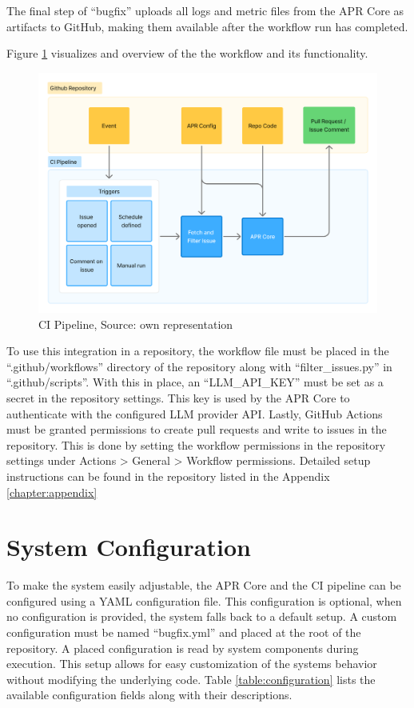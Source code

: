 The final step of ``bugfix'' uploads all logs and metric files from the APR Core as artifacts to GitHub, making them available after the workflow run has completed.

Figure \ref{fig:ci} visualizes and overview of the the workflow and its functionality.

\begin{figure}[H]
    \centering
    \includegraphics[width=1\textwidth]{images/flowcharts/ci.png}
    \caption{CI Pipeline, Source: own representation}
    \label{fig:ci}
\end{figure}

To use this integration in a repository, the workflow file must be placed in the ``.github/workflows'' directory of the repository along with ``filter\_issues.py'' in ``.github/scripts''. With this in place, an ``LLM\_API\_KEY'' must be set as a secret in the repository settings. This key is used by the APR Core to authenticate with the configured \ac{LLM} provider API. Lastly, GitHub Actions must be granted permissions to create pull requests and write to issues in the repository. This is done by setting the workflow permissions in the repository settings under Actions > General > Workflow permissions. Detailed setup instructions can be found in the repository listed in the Appendix \ref{chapter:appendix}

\section{System Configuration}
To make the system easily adjustable, the APR Core and the \ac{CI} pipeline can be configured using a YAML configuration file. This configuration is optional, when no configuration is provided, the system falls back to a default setup. A custom configuration must be named ``bugfix.yml'' and placed at the root of the repository. A placed configuration is read by system components during execution. This setup allows for easy customization of the systems behavior without modifying the underlying code. Table \ref{table:configuration} lists the available configuration fields along with their descriptions.


